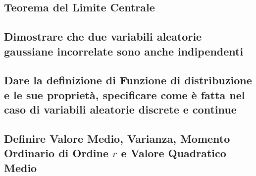 \documentclass[12pt,oneside,openany]{memoir}
\numberwithin{equation}{subsection}
\begin{document}

\newpage
\subsection{Teorema del Limite Centrale}


\newpage
\subsection{Dimostrare che due variabili aleatorie gaussiane incorrelate sono
anche indipendenti}


\newpage
\subsection{Dare la definizione di Funzione di distribuzione e le sue
propriet\`a, specificare come \`e fatta nel caso di variabili aleatorie discrete
e continue}


\newpage
\subsection{Definire Valore Medio, Varianza, Momento Ordinario di Ordine $r$ e
Valore Quadratico Medio}

\end{document}
